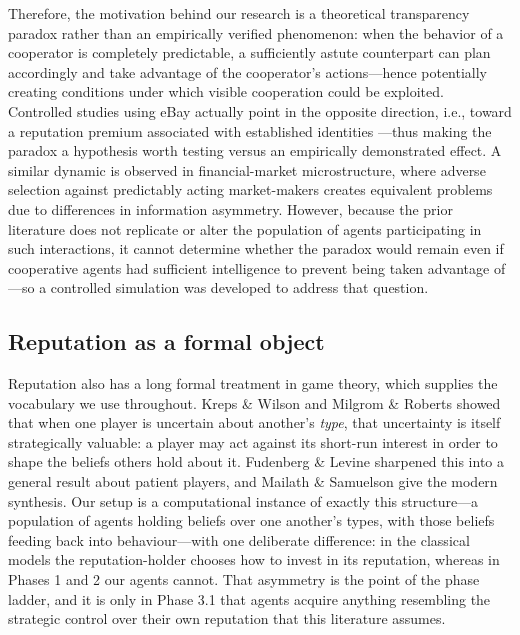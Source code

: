 \documentclass[10pt,twocolumn,letterpaper]{article}
\begin{document}
Therefore, the motivation behind our research is a
theoretical transparency paradox rather than an empirically verified
phenomenon: when the behavior of a cooperator is completely
predictable, a sufficiently astute counterpart can plan accordingly
and take advantage of the cooperator's actions---hence potentially
creating conditions under which visible cooperation could be
exploited. Controlled studies using eBay actually point in the
opposite direction, i.e., toward a reputation premium associated with
established identities \citep{resnick2006value}---thus making the
paradox a hypothesis worth testing versus an empirically demonstrated
effect. A similar dynamic
is observed in financial-market microstructure, where adverse
selection against predictably acting market-makers
\citep{glosten1985bid} creates equivalent problems due to differences
in information asymmetry. However, because the prior literature does
not replicate or alter the population of agents participating in such
interactions, it cannot determine whether the paradox would remain
even if cooperative agents had sufficient intelligence to prevent
being taken advantage of---so a controlled simulation was developed
to address that question.

\subsection{Reputation as a formal object}
Reputation also has a long formal treatment in game theory, which
supplies the vocabulary we use throughout. Kreps \& Wilson
\citep{kreps1982reputation} and Milgrom \& Roberts
\citep{milgrom1982predation} showed that when one player is
uncertain about another's \emph{type}, that uncertainty is itself
strategically valuable: a player may act against its short-run
interest in order to shape the beliefs others hold about it.
Fudenberg \& Levine \citep{fudenberg1989reputation} sharpened this
into a general result about patient players, and Mailath \&
Samuelson \citep{mailath2006repeated} give the modern synthesis.
Our setup is a computational instance of exactly this structure---a
population of agents holding beliefs over one another's types, with
those beliefs feeding back into behaviour---with one deliberate
difference: in the classical models the reputation-holder chooses
how to invest in its reputation, whereas in Phases 1 and 2 our
agents cannot. That asymmetry is the point of the phase ladder, and
it is only in Phase 3.1 that agents acquire anything resembling the
strategic control over their own reputation that this literature
assumes.
\end{document}
